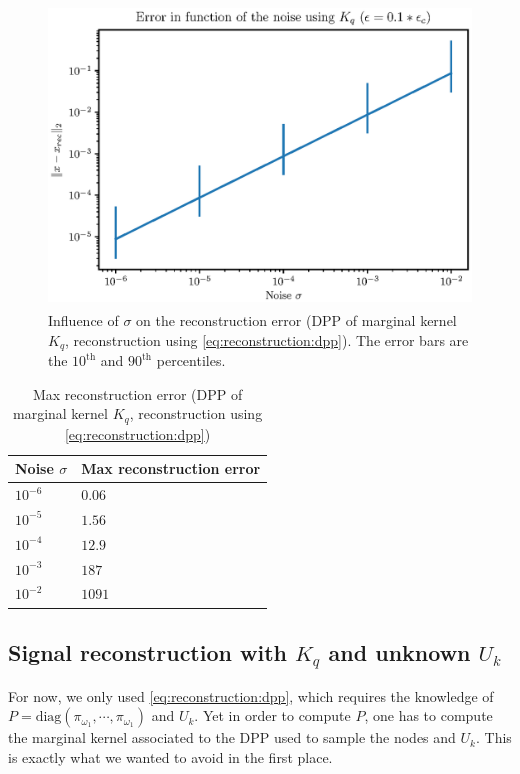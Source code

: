 \documentclass{article}
\begin{document}
\begin{figure}[ht]
\centering
\includegraphics[height=8cm]{error_function_noise_Kq.eps}
\caption{Influence of $\sigma$ on the reconstruction error (DPP of marginal kernel $K_q$, reconstruction using \eqref{eq:reconstruction:dpp}). The error bars are the $10^\text{th}$ and $90^\text{th}$ percentiles.} \label{fig:Kq:recerror}
\end{figure}


\begin{table}[ht]
  \caption{Max reconstruction error (DPP of marginal kernel $K_q$, reconstruction using \eqref{eq:reconstruction:dpp})}
  \label{tab:Kq:maxrecerror}
  \centering
  \begin{tabular}{ll}
    \toprule
    Noise $\sigma$ &  Max reconstruction error \\
    \midrule
    $10^{-6}$ & $0.06$ \\
    $10^{-5}$ & $1.56$ \\
    $10^{-4}$ & $12.9$ \\
		$10^{-3}$ & $187$ \\
		$10^{-2}$ & $1091$ \\
    \bottomrule
  \end{tabular}
\end{table}


\subsection[Signal reconstruction with Kq and unknown Uk]{Signal reconstruction with $K_q$ and unknown $U_k$}


For now, we only used \eqref{eq:reconstruction:dpp}, which requires the knowledge of $P = \mathrm{diag} (\pi_{\omega_1}, \cdots, \pi_{\omega_1})$ and $U_k$. Yet in order to compute $P$, one has to compute the marginal kernel associated to the DPP used to sample the nodes and $U_k$. This is exactly what we wanted to avoid in the first place.
\end{document}
